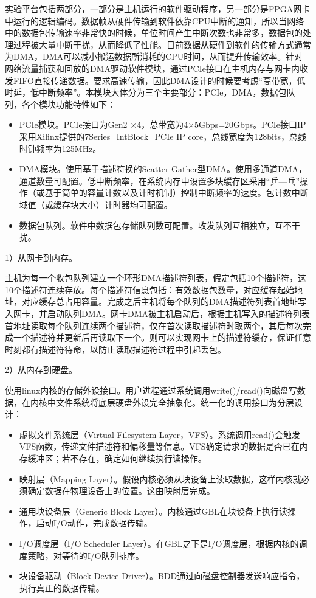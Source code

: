 \label{chap361}

实验平台包括两部分，一部分是主机运行的软件驱动程序，另一部分是FPGA网卡中运行的逻辑编码。数据帧从硬件传输到软件依靠CPU中断的通知，所以当网络中的数据包传输速率非常快的时候，单位时间产生中断次数也非常多，数据包的处理过程被大量中断干扰，从而降低了性能。目前数据从硬件到软件的传输方式通常为DMA，DMA可以减小搬运数据所消耗的CPU时间，从而提升传输效率。针对网络流量捕获和回放的DMA驱动软件模块，通过PCIe接口在主机内存与网卡内收发FIFO直接传递数据。要求高速传输，因此DMA设计的时候要考虑“高带宽，低时延，低中断频率”。本模块大体分为三个主要部分：PCIe，DMA，数据包队列，各个模块功能特性如下：

\begin{itemize}
	\item PCIe模块。PCIe接口为Gen2 $\times$4，总带宽为4$\times$5Gbps=20Gbps。PCIe接口IP采用Xilinx提供的7Series\_IntBlock\_PCIe IP core，总线宽度为128bits，总线时钟频率为125MHz。
	\item DMA模块。使用基于描述符换的Scatter-Gather型DMA。使用多通道DMA，通道数量可配置。低中断频率，在系统内存中设置多块缓存区采用“乒---乓”操作（或基于简单的容量计数以及计时机制）控制中断频率的速度。包计数中断域值（或缓存块大小）计时器均可配置。
	\item 数据包队列。软件中数据包存储队列数可配置。收发队列互相独立，互不干扰。
\end{itemize}

1）从网卡到内存。

主机为每一个收包队列建立一个环形DMA描述符列表，假定包括10个描述符，这10个描述符连续存放。每个描述符信息包括：有效数据包数量，对应缓存起始地址，对应缓存总占用容量。完成之后主机将每个队列的DMA描述符列表首地址写入网卡，并启动队列DMA。网卡DMA被主机启动后，根据主机写入的描述符列表首地址读取每个队列连续两个描述符，仅在首次读取描述符时取两个，其后每次完成一个描述符并更新后再读取下一个。则可以实现网卡上的描述符缓存，保证任意时刻都有描述符待命，以防止读取描述符过程中引起丢包。

2）从内存到硬盘。

使用linux内核的存储外设接口。用户进程通过系统调用write()/read()向磁盘写数据，在内核中文件系统将底层硬盘外设完全抽象化。统一化的调用接口为分层设计：

\begin{itemize}
	\item 虚拟文件系统层（Virtual Filesystem Layer，VFS）。系统调用read()会触发VFS函数，传递文件描述符和偏移量等信息。VFS确定请求的数据是否已在内存缓冲区；若不存在，确定如何继续执行读操作。
	\item 映射层（Mapping Layer）。假设内核必须从块设备上读取数据，这样内核就必须确定数据在物理设备上的位置。这由映射层完成。
	\item 通用块设备层（Generic Block Layer）。内核通过GBL在块设备上执行读操作，启动I/O动作，完成数据传输。
	\item I/O调度层（I/O Scheduler Layer）。在GBL之下是I/O调度层，根据内核的调度策略，对等待的I/O队列排序。
	\item 块设备驱动（Block Device Driver）。BDD通过向磁盘控制器发送响应指令，执行真正的数据传输。
\end{itemize}

